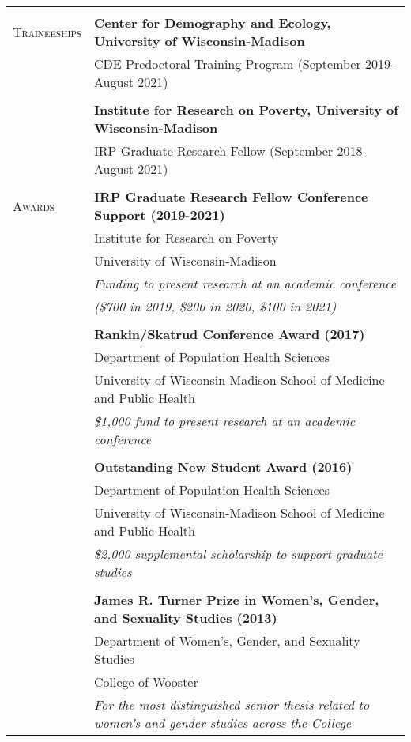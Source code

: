 \documentclass[letterpaper,10pt,oneside]{article}
\begin{document}
\begin{longtable}{@{} p{} p{}}
     & \\
\textsc{Traineeships} &\textbf{Center for Demography and Ecology, University of Wisconsin-Madison} \\
     & CDE Predoctoral Training Program (September 2019-August 2021) \\
     & \\
     &\textbf{Institute for Research on Poverty, University of Wisconsin-Madison} \\
     & IRP Graduate Research Fellow (September 2018-August 2021) \\
     & \\
\textsc{Awards} 
     &\textbf{IRP Graduate Research Fellow Conference Support (2019-2021)} \\
     & Institute for Research on Poverty \\
     & University of Wisconsin-Madison \\
     & \textit{Funding to present research at an academic conference} \\
     & \textit{(\$700 in 2019, \$200 in 2020, \$100 in 2021)} \\
     & \\
     &\textbf{Rankin/Skatrud Conference Award (2017)} \\
     & Department of Population Health Sciences \\
     & University of Wisconsin-Madison School of Medicine and Public Health \\
     & \textit{\$1,000 fund to present research at an academic conference} \\
     & \\
     &\textbf{Outstanding New Student Award (2016)} \\
     & Department of Population Health Sciences \\
     & University of Wisconsin-Madison School of Medicine and Public Health \\
     & \textit{\$2,000 supplemental scholarship to support graduate studies} \\
     & \\
     &\textbf{James R. Turner Prize in Women's, Gender, and Sexuality Studies (2013)} \\
     & Department of Women's, Gender, and Sexuality Studies \\
     & College of Wooster \\
     & \textit{For the most distinguished senior thesis related to women's and gender studies across the College} \\

\end{longtable}
\end{document}
